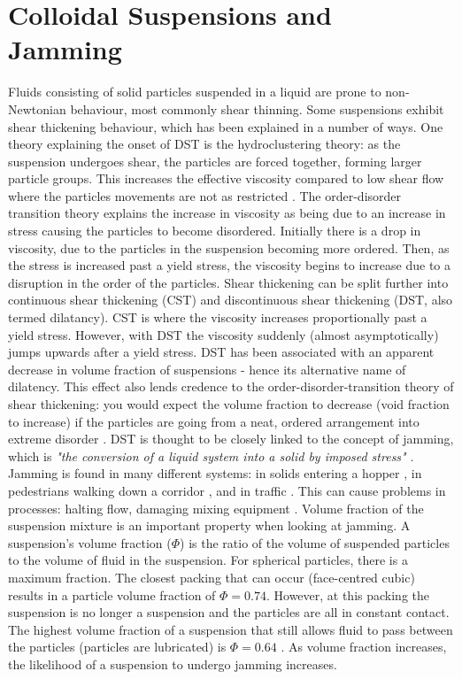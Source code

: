 \documentclass[twoside,a4]{report}
\def\br{\newline \newline \noindent}
\begin{document}
	\section*{Colloidal Suspensions and Jamming} %
	Fluids consisting of solid particles suspended in a liquid are prone to non-Newtonian behaviour, most commonly shear thinning. Some suspensions exhibit shear thickening behaviour, which has been explained in a number of ways. One theory explaining the onset of DST is the hydroclustering theory: as the suspension undergoes shear, the particles are forced together, forming larger particle groups. This increases the effective viscosity compared to low shear flow where the particles movements are not as restricted \cite[p.~7]{backbrownjaegrev}. The order-disorder transition  theory explains the increase in viscosity as being due to an increase in stress causing the particles to become disordered. Initially there is a drop in viscosity, due to the particles in the suspension becoming more ordered. Then, as the stress is increased past a yield stress, the viscosity begins to increase due to a disruption in the order of the particles. %
	\br
	Shear thickening can be split further into continuous shear thickening (CST) and discontinuous shear thickening (DST, also termed dilatancy). CST is where the viscosity increases proportionally past a yield stress. However, with DST the viscosity suddenly (almost asymptotically) jumps upwards after a yield stress. DST has been associated with an apparent decrease in volume fraction of suspensions - hence its alternative name of dilatency. This effect also lends credence to the order-disorder-transition theory of shear thickening: you would expect the volume fraction to decrease (void fraction to increase) if the particles are going from a neat, ordered arrangement into extreme disorder \cite[p.~7]{backbrownjaegrev}. \br
	DST is thought to be closely linked to the concept of jamming, which is \textit{"the conversion of a liquid system into a solid by imposed stress"} \cite{backhawjam}. Jamming is found in many different systems: in solids entering a hopper \cite{back2djam}, in pedestrians walking down a corridor \cite{backpedjam}, and in traffic \cite{backcarjam}. This can cause problems in processes: halting flow, damaging mixing equipment \cite{backshearjambertrand}. \br 
	Volume fraction of the suspension mixture is an important property when looking at jamming. A suspension's volume fraction (\( \Phi \)) is the ratio of the volume of suspended particles to the volume of fluid in the suspension. For spherical particles, there is a maximum fraction. The closest packing that can occur (face-centred cubic) results in a particle volume fraction of \( \Phi = 0.74 \). However, at this packing the suspension is no longer a suspension and the particles are all in constant contact. The highest volume fraction of a suspension that still allows fluid to pass between the particles (particles are lubricated) is \( \Phi = 0.64 \) \cite{backguypoonjam}. As volume fraction increases, the likelihood of a suspension to undergo jamming increases. \br
\end{document}
